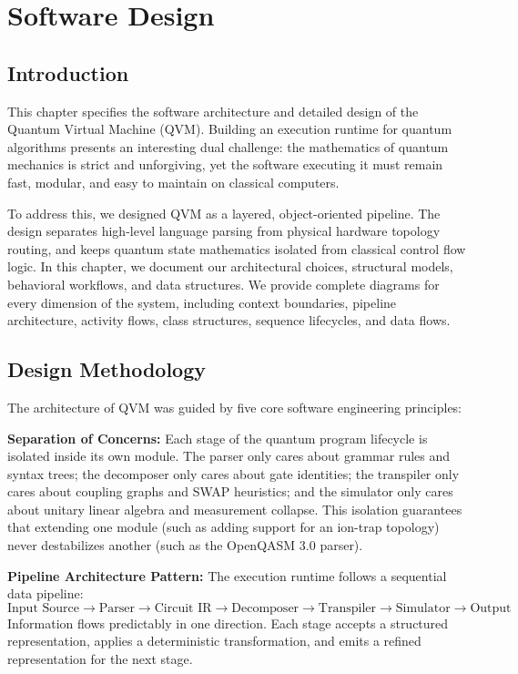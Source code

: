 \chapter{Software Design}

\section{Introduction}
This chapter specifies the software architecture and detailed design of the Quantum Virtual Machine (QVM). Building an execution runtime for quantum algorithms presents an interesting dual challenge: the mathematics of quantum mechanics is strict and unforgiving, yet the software executing it must remain fast, modular, and easy to maintain on classical computers.

To address this, we designed QVM as a layered, object-oriented pipeline. The design separates high-level language parsing from physical hardware topology routing, and keeps quantum state mathematics isolated from classical control flow logic. In this chapter, we document our architectural choices, structural models, behavioral workflows, and data structures. We provide complete diagrams for every dimension of the system, including context boundaries, pipeline architecture, activity flows, class structures, sequence lifecycles, and data flows.

\section{Design Methodology}
The architecture of QVM was guided by five core software engineering principles:

\textbf{Separation of Concerns:} Each stage of the quantum program lifecycle is isolated inside its own module. The parser only cares about grammar rules and syntax trees; the decomposer only cares about gate identities; the transpiler only cares about coupling graphs and SWAP heuristics; and the simulator only cares about unitary linear algebra and measurement collapse. This isolation guarantees that extending one module (such as adding support for an ion-trap topology) never destabilizes another (such as the OpenQASM 3.0 parser).

\textbf{Pipeline Architecture Pattern:} The execution runtime follows a sequential data pipeline:
$$\text{Input Source} \longrightarrow \text{Parser} \longrightarrow \text{Circuit IR} \longrightarrow \text{Decomposer} \longrightarrow \text{Transpiler} \longrightarrow \text{Simulator} \longrightarrow \text{Output}$$
Information flows predictably in one direction. Each stage accepts a structured representation, applies a deterministic transformation, and emits a refined representation for the next stage.

